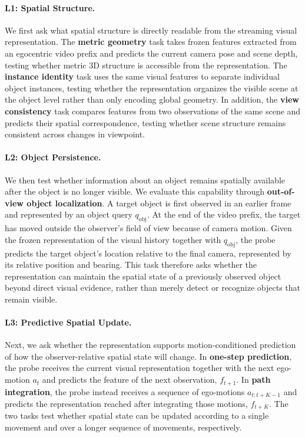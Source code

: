 \documentclass{article} %
\begin{document}
\paragraph{L1: Spatial Structure.}
We first ask what spatial structure is directly readable from the
streaming visual representation. The \textbf{metric geometry} task
takes frozen features extracted from an egocentric video prefix and
predicts the current camera pose and scene depth, testing whether metric
3D structure is accessible from the representation. The
\textbf{instance identity} task uses the same visual features to
separate individual object instances, testing whether the representation
organizes the visible scene at the object level rather than only encoding
global geometry. In addition, the \textbf{view consistency} task
compares features from two observations of the same scene and predicts
their spatial correspondence, testing whether scene structure remains
consistent across changes in viewpoint.

\paragraph{L2: Object Persistence.}
We then test whether information about an object remains spatially
available after the object is no longer visible. We evaluate this capability
through \textbf{out-of-view object localization}. A target object is first
observed in an earlier frame and represented by an object query
$q_{\mathrm{obj}}$. At the end of the video prefix, the target has moved
outside the observer's field of view because of camera motion. Given the
frozen representation of the visual history together with
$q_{\mathrm{obj}}$, the probe predicts the target object's location
relative to the final camera, represented by its relative position and
bearing. This task therefore asks whether the representation can maintain
the spatial state of a previously observed object beyond direct visual
evidence, rather than merely detect or recognize objects that remain
visible.

\paragraph{L3: Predictive Spatial Update.}
Next, we ask whether the representation supports motion-conditioned
prediction of how the observer-relative spatial state will change.
In \textbf{one-step prediction}, the probe receives the current visual
representation together with the next ego-motion $a_t$ and predicts the
feature of the next observation, $f_{t+1}$. In \textbf{path integration},
the probe instead receives a sequence of ego-motions
$a_{t:t+K-1}$ and predicts the representation reached after integrating
those motions, $f_{t+K}$. The two tasks test whether spatial state can be
updated according to a single movement and over a longer sequence of
movements, respectively.
\end{document}
